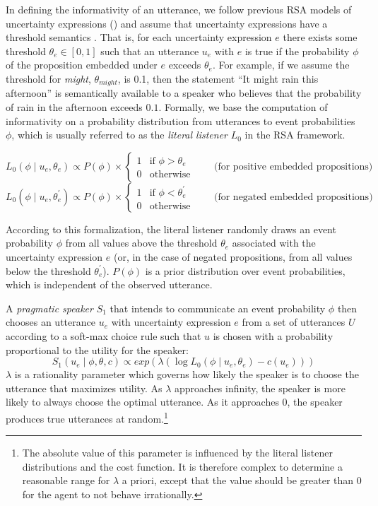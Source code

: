 In defining the informativity of an utterance, we follow previous RSA models of uncertainty expressions (\cite{Herbstritt2019}) 
and assume that uncertainty expressions have a threshold semantics \cite{Swanson2006,Yalcin2010,Lassiter2016}. That is, for each uncertainty expression $e$ there exists some threshold $\theta_e \in [0,1]$ 
such that an utterance $u_e$ with $e$ is true if the probability $\phi$ 
of the proposition embedded under $e$ exceeds $\theta_e$. 
For example, if we assume the threshold for \textit{might}, $\theta_{might}$, is 0.1, then the statement 
``It might rain this afternoon'' is semantically available to a {speaker} who believes that the probability of rain in the afternoon exceeds $0.1$.
Formally, we base the computation of informativity on a probability distribution from utterances to event probabilities $\phi$, 
which is usually referred to as the \textit{literal listener} $L_0$ in the RSA framework. 

$$L_0\left(\phi \mid u_e, \theta_e\right) \propto P(\phi) \times 
\begin{cases}
1 & \mbox{if } \phi > \theta_e\\
0 & \mbox{otherwise} 
\end{cases} \qquad \mbox{(for positive embedded propositions)}$$
$$L_0\left(\phi \mid u_e, \theta_e^{'}\right) \propto P(\phi) \times 
\begin{cases}
1 & \mbox{if } \phi < \theta_e^{'} \\
0 & \mbox{otherwise} 
\end{cases} \qquad \mbox{(for negated embedded propositions)}$$

According to this formalization, the {literal listener}  randomly draws an event probability $\phi$ from all values above  the threshold $\theta_e$ associated with the uncertainty expression $e$ (or, in the case of negated propositions, from all values below the threshold $\theta_e^{'}$). $P(\phi)$ is a prior distribution over event probabilities, which is independent of the observed utterance.

A \textit{pragmatic speaker} $S_1$ that intends to communicate an event probability $\phi$ then chooses an utterance $u_e$ with uncertainty expression $e$ from a set of utterances $U$ according to a soft-max choice rule \cite{Luce1959,Sutton1998} such that $u$ is chosen with a probability proportional to the utility for the speaker:
$$S_1\left(u_e \mid \phi, \theta, c\right) \propto exp \left( \lambda \left( \log L_0\left(\phi \mid u_e, \theta_e\right)  - c(u_e)\right)\right)$$
$\lambda$ is a rationality parameter which governs how likely the {speaker} is to choose the utterance that maximizes utility. As $\lambda$ approaches infinity, the {speaker} is more likely to always choose the optimal utterance. As it approaches 0, the {speaker} produces true utterances at random.\footnote{
The absolute value of this parameter is influenced by the literal listener distributions and the cost function. It is therefore complex to determine a reasonable range for $\lambda$ a priori, except that the value should be greater than 0 for the agent to not behave irrationally.} 


